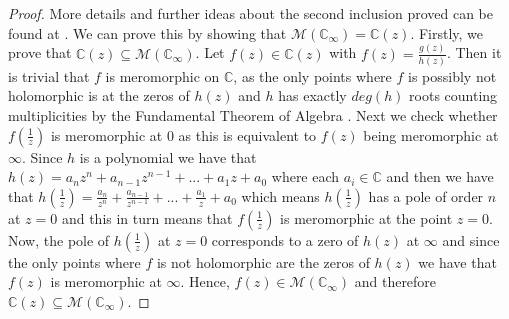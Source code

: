 \documentclass{article}
\begin{document}
\begin{proof}
More details and further ideas about the second inclusion proved can be found at \cite{Meromorphic proof}.
 We can prove this by showing that $\mathcal{M}(\mathbb{C}_{\infty})=\mathbb{C}(z)$.
 Firstly, we prove that $\mathbb{C}(z)\subseteq\mathcal{M}(\mathbb{C}_{\infty})$. Let $f(z)\in\mathbb{C}(z)$ with $f(z)=\frac{g(z)}{h(z)}$. Then it is trivial that $f$ is meromorphic on $\mathbb{C}$, as the only points where $f$ is possibly not holomorphic is at the zeros of $h(z)$ and $h$ has exactly $deg(h)$ roots counting multiplicities by the Fundamental Theorem of Algebra \cite[p.~97]{CA}. Next we check whether $f(\frac{1}{z})$ is meromorphic at $0$ as this is equivalent to $f(z)$ being meromorphic at $\infty$. Since $h$ is a polynomial we have that $h(z)=a_{n}z^{n}+a_{n-1}z^{n-1}+...+a_{1}z+a_{0}$ where each $a_{i}\in\mathbb{C}$ and then we have that $h(\frac{1}{z})=\frac{a_{n}}{z^{n}}+\frac{a_{n-1}}{z^{n-1}}+...+\frac{a_{1}}{z}+a_{0}$ which means $h(\frac{1}{z})$ has a pole of order $n$ at $z=0$ and this in turn means that $f(\frac{1}{z})$ is meromorphic at the point $z=0$. Now, the pole of $h(\frac{1}{z})$ at $z=0$ corresponds to a zero of $h(z)$ at $\infty$ and since the only points where $f$ is not holomorphic are the zeros of $h(z)$ we have that $f(z)$ is meromorphic at $\infty$. Hence, $f(z)\in\mathcal{M}(\mathbb{C}_{\infty})$ and therefore $\mathbb{C}(z)\subseteq\mathcal{M}(\mathbb{C}_{\infty})$. 
 


\end{proof}
\end{document}
